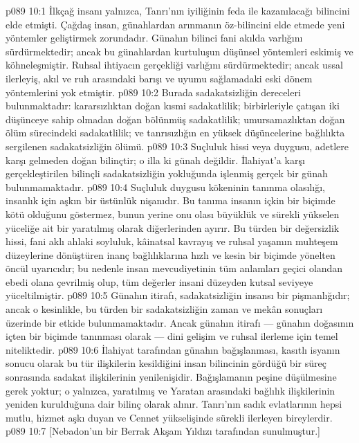 \vs p089 10:1 İlkçağ insanı yalnızca, Tanrı’nın iyiliğinin feda ile kazanılacağı bilincini elde etmişti. Çağdaş insan, günahlardan arınmanın öz\hyp{}bilincini elde etmede yeni yöntemler geliştirmek zorundadır. Günahın bilinci fani akılda varlığını sürdürmektedir; ancak bu günahlardan kurtuluşun düşünsel yöntemleri eskimiş ve köhneleşmiştir. Ruhsal ihtiyacın gerçekliği varlığını sürdürmektedir; ancak ussal ilerleyiş, akıl ve ruh arasındaki barışı ve uyumu sağlamadaki eski dönem yöntemlerini yok etmiştir.
\vs p089 10:2  Burada sadakatsizliğin dereceleri bulunmaktadır: kararsızlıktan doğan kısmi sadakatlilik; birbirleriyle çatışan iki düşünceye sahip olmadan doğan bölünmüş sadakatlilik; umursamazlıktan doğan ölüm sürecindeki sadakatlilik; ve tanrısızlığın en yüksek düşüncelerine bağlılıkta sergilenen sadakatsizliğin ölümü.
\vs p089 10:3 Suçluluk hissi veya duygusu, adetlere karşı gelmeden doğan bilinçtir; o illa ki günah değildir. İlahiyat’a karşı gerçekleştirilen bilinçli sadakatsizliğin yokluğunda işlenmiş gerçek bir günah bulunmamaktadır.
\vs p089 10:4 Suçluluk duygusu kökeninin tanınma olasılığı, insanlık için aşkın bir üstünlük nişanıdır. Bu tanıma insanın içkin bir biçimde kötü olduğunu göstermez, bunun yerine onu olası büyüklük ve sürekli yükselen yüceliğe ait bir yaratılmış olarak diğerlerinden ayırır. Bu türden bir değersizlik hissi, fani aklı ahlaki soyluluk, kâinatsal kavrayış ve ruhsal yaşamın muhteşem düzeylerine dönüştüren inanç bağlılıklarına hızlı ve kesin bir biçimde yönelten öncül uyarıcıdır; bu nedenle insan mevcudiyetinin tüm anlamları geçici olandan ebedi olana çevrilmiş olup, tüm değerler insani düzeyden kutsal seviyeye yüceltilmiştir.
\vs p089 10:5 Günahın itirafı, sadakatsizliğin insansı bir pişmanlığıdır; ancak o kesinlikle, bu türden bir sadakatsizliğin zaman ve mekân sonuçları üzerinde bir etkide bulunmamaktadır. Ancak günahın itirafı --- günahın doğasının içten bir biçimde tanınması olarak --- dini gelişim ve ruhsal ilerleme için temel niteliktedir.
\vs p089 10:6 İlahiyat tarafından günahın bağışlanması, kasıtlı isyanın sonucu olarak bu tür ilişkilerin kesildiğini insan bilincinin gördüğü bir süreç sonrasında sadakat ilişkilerinin yenilenişidir. Bağışlamanın peşine düşülmesine gerek yoktur; o yalnızca, yaratılmış ve Yaratan arasındaki bağlılık ilişkilerinin yeniden kurulduğuna dair bilinç olarak alınır. Tanrı’nın sadık evlatlarının hepsi mutlu, hizmet aşkı duyan ve Cennet yükselişinde sürekli ilerleyen bireylerdir.
\vs p089 10:7 [Nebadon’un bir Berrak Akşam Yıldızı tarafından sunulmuştur.]
